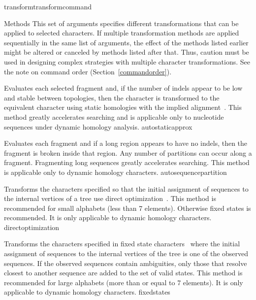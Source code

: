 \begin{command}{transform}{transformcommand}
\begin{arguments}
           \begin{argumentgroup}{Methods}
            This set of arguments specifies different transformations that can be applied
            to selected characters. If multiple transformation methods are applied
            sequentially in the same list of arguments, the effect of the methods listed
            earlier might be altered or canceled by methods listed after that. Thus, caution
            must be used in designing complex strategies with multiple character
            transformations. See the note on command order (Section~\ref{commandorder}).

            {Evaluates each selected fragment and, if the number of indels
            appear to be low and stable between topologies, then the character
            is transformed to the equivalent character using static homologies
            with the implied alignment~\cite{wheeler2003}.
            This method greatly accelerates searching and is applicable only to nucleotide sequences under dynamic homology analysis.}
            {autostaticapprox}

            {Evaluates each fragment and if a long region appears 
            to have no indels, then the fragment is broken inside that region.
            Any number of partitions can occur along a fragment. Fragmenting
            long sequences greatly accelerates searching. This method is applicable only to dynamic homology characters.}
            {autosequencepartition}

          {Transforms the characters specified so that the initial assignment of sequences to 
          the internal vertices of a tree use direct
          optimization~\cite{wheeler1996}. This method is recommended for small
          alphabets (less than 7 elements). Otherwise fixed states is
          recommended. It is only applicable to dynamic homology
          characters.}
          {directoptimization}

          {Transforms the characters specified in fixed state characters~\cite{wheeler1999a}
          where the initial assignment of sequences to the internal vertices of
          the tree is one of the observed sequences. If the observed sequences
          contain ambiguities, only those that resolve closest to another
          sequence are added to the set of valid states. This method is
          recommended for large alphabets (more than or equal to 7 elements). It is only
          applicable to dynamic homology characters.}
          {fixedstates}
          

\end{argumentgroup}
\end{arguments}
\end{command}
